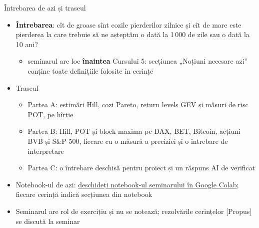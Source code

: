 \begin{frame}{Întrebarea de azi și traseul}
\itemsize{\small}
\begin{itemize}
    \item \textbf{Întrebarea}: cît de groase sînt cozile pierderilor zilnice și cît de mare este pierderea la care trebuie să ne așteptăm o dată la 1\,000 de zile sau o dată la 10 ani?
    \begin{itemize}
        \item seminarul are loc \textbf{înaintea} Cursului 5: secțiunea „Noțiuni necesare azi” conține toate definițiile folosite în cerințe
    \end{itemize}
    \item Traseul
    \begin{itemize}
        \item Partea A: estimări Hill, cozi Pareto, return levels GEV și măsuri de risc POT, pe hîrtie
        \item Partea B: Hill, POT și block maxima pe DAX, BET, Bitcoin, acțiuni BVB și S\&P 500, fiecare cu o măsură a preciziei și o întrebare de interpretare
        \item Partea C: o întrebare deschisă pentru proiect și un răspuns AI de verificat
    \end{itemize}
    \item Notebook-ul de azi: \href{\nb}{deschideți notebook-ul seminarului în Google Colab}; fiecare cerință indică secțiunea din notebook
    \item Seminarul are rol de exercițiu și nu se notează; rezolvările cerințelor [Propus] se discută la seminar
\end{itemize}
\end{frame}

